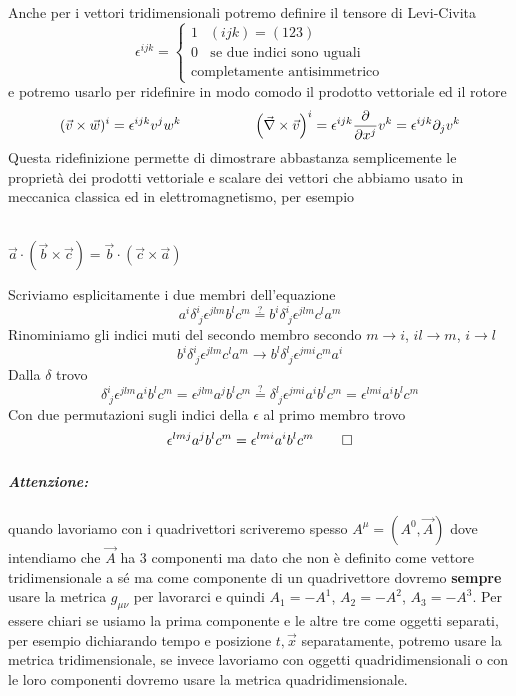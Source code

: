 \documentclass[12pt,a4paper,titlepage, twoside, openright]{book}
\newenvironment{proof:}[1][\proofname]{  %
 \begin{tcolorbox}[
	breakable, 
	enhanced, 
	interior hidden, 
	frame hidden, 
	borderline west = {1pt}{0pt}{gray}, 
	top=0pt, bottom=0pt, left=0pt]
\begin{proof}[#1:]~
}
{
\end{proof}
\end{tcolorbox}
}
\newenvironment{proposizione}[1][\empty]{\begin{Proposizione}{
\ifx\empty#1\relax\else\mdseries\itshape#1\\\fi
}{}}{\end{Proposizione}}
\numberwithin{equation}{chapter}
\begin{document}
Anche per i vettori tridimensionali potremo definire il tensore di Levi-Civita 
\[\epsilon^{ijk}=\begin{cases} 1 \>\>\,\, (ijk)=(123) \\ 0 \>\>\>\> \text{se due indici sono uguali} \\ \text{completamente antisimmetrico} \end{cases} \]
e potremo usarlo per ridefinire in modo comodo il prodotto vettoriale ed il rotore
\begin{equation}
(\vec{v}\times\vec{w})^i=\epsilon^{ijk}v^jw^k \hspace{0.15\linewidth} \left(\vec{\nabla}\times\vec{v}\right)^i=\epsilon^{ijk}\dfrac{\partial}{\partial x^j}v^k=\epsilon^{ijk}\partial_j v^k
\end{equation}
Questa ridefinizione permette di dimostrare abbastanza semplicemente le proprietà dei prodotti vettoriale e scalare dei vettori che abbiamo usato in meccanica classica ed in elettromagnetismo, per esempio
\begin{proposizione}
$\vec{a}\cdot\left(\vec{b}\times\vec{c}\right)=\vec{b}\cdot\left(\vec{c}\times\vec{a}\right)$
\end{proposizione}
\begin{proof:}
Scriviamo esplicitamente i due membri dell'equazione
\[
a^i\delta^i_{\> j}\epsilon^{jlm}b^lc^m \overset{\text{?}}{=} b^i\delta^i_{\>j}\epsilon^{jlm}c^la^m
\]
Rinominiamo gli indici muti del secondo membro secondo $m\rightarrow i$, $il\rightarrow m$, $i\rightarrow l$
\[
b^i\delta^i_{\>j}\epsilon^{jlm}c^la^m \rightarrow b^l\delta^l_{\>j}\epsilon^{jmi}c^ma^i
\]
Dalla $\delta$ trovo
\[
\delta^i_{\> j}\epsilon^{jlm}a^ib^lc^m=\epsilon^{jlm}a^jb^lc^m \overset{\text{?}}{=} \delta^l_{\>j}\epsilon^{jmi}a^ib^lc^m=\epsilon^{lmi}a^ib^lc^m
\]
Con due permutazioni sugli indici della $\epsilon$ al primo membro trovo
\[
\epsilon^{lmj}a^jb^lc^m=\epsilon^{lmi}a^ib^lc^m \qedhere
\]
\end{proof:}



\subparagraph{Attenzione:} quando lavoriamo con i quadrivettori scriveremo spesso $A^\mu=(A^0,\vec{A})$ dove intendiamo che $\vec{A}$ ha $3$ componenti ma dato che non è definito come vettore tridimensionale a sé ma come componente di un quadrivettore dovremo \textbf{sempre} usare la metrica $g_{\mu\nu}$ per lavorarci e quindi $A_1=-A^1$, $A_2=-A^2$, $A_3=-A^3$. Per essere chiari se usiamo la prima componente e le altre tre come oggetti separati, per esempio dichiarando tempo e posizione $t,\vec{x}$ separatamente, potremo usare la metrica tridimensionale, se invece lavoriamo con oggetti quadridimensionali o con le loro componenti dovremo usare la metrica quadridimensionale.
\end{document}
